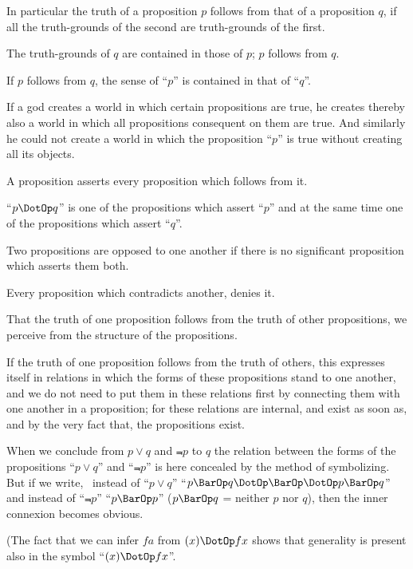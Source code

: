 {In particular the truth of a proposition $p$ follows
from that of a proposition $q$, if all the truth-grounds
of the second are truth-grounds of the
first.}


{The truth-grounds of $q$ are contained in those
of $p$; $p$ follows from $q$.}


{If $p$ follows from $q$, the sense of ``$p$'' is contained
in that of ``$q$''.}


{If a god creates a world in which certain propositions
are true, he creates thereby also a world
in which all propositions consequent on them are
true. And similarly he could not create a world
in which the proposition ``$p$'' is true without
creating all its objects.}


{A proposition asserts every proposition which
follows from it.}


{``$p \DotOp q$'' is one of the propositions which assert
``$p$'' and at the same time one of the propositions
which assert ``$q$''.

Two propositions are opposed to one another
if there is no significant proposition which asserts
them both.

Every proposition which contradicts another,
denies it.}


{That the truth of one proposition follows from
the truth of other propositions, we perceive from
the structure of the propositions.}


{If the truth of one proposition follows from the
truth of others, this expresses itself in relations in
which the forms of these propositions stand to one
another, and we do not need to put them in these
relations first by connecting them with one another
in a proposition; for these relations are internal,
and exist as soon as, and by the very fact that,
the propositions exist.}


{When we conclude from $p \lor q$ and $\Not{p}$ to $q$ the
relation between the forms of the propositions
``$p \lor q$'' and ``$\Not{p}$'' is here concealed by the method
of symbolizing. But if we write, \exempliGratia\ instead of
``$p \lor q$'' ``$p \BarOp q \DotOp \BarOp \DotOp p \BarOp q$'' and instead of ``$\Not{p}$''
``$p \BarOp p$'' ($p \BarOp q$ = neither $p$ nor $q$), then the inner
connexion becomes obvious.

(The fact that we can infer $fa$ from $(x) \DotOp fx$ shows
that generality is present also in the symbol
``$(x) \DotOp fx$''.}


